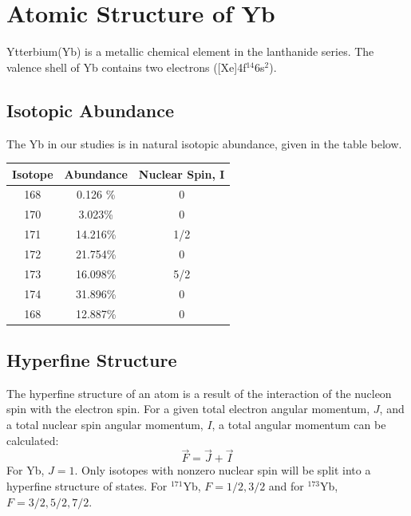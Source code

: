 \documentclass[12pt, a4paper]{article}
\begin{document}
\section{Atomic Structure of Yb}
Ytterbium(Yb) is a metallic chemical element in the lanthanide series. The valence shell of Yb contains two electrons ([Xe]4f$^{14}$6s$^{2}$).
\subsection{Isotopic Abundance}
The Yb in our studies is in natural isotopic abundance, given in the table below.
\begin{center}
\begin{tabular}{||c|c|c||}
\hline
Isotope & Abundance & Nuclear Spin, I\\
\hline \hline
168 & 0.126 \% & 0\\
\hline
170 & 3.023\% & 0 \\
\hline
171 & 14.216\% & 1/2 \\
\hline
172 & 21.754\% & 0 \\
\hline
173 & 16.098\% & 5/2 \\
\hline
174 & 31.896\% & 0 \\
\hline
168 & 12.887\% & 0 \\
\hline
\end{tabular}
\end{center}
\subsection{Hyperfine Structure}
The hyperfine structure of an atom is a result of the interaction of the nucleon spin with the electron spin. For a given total electron angular momentum, $J$, and a total nuclear spin angular momentum, $I$, a total angular momentum can be calculated:
\begin{equation}
\vec{F} = \vec{J} +\vec{I}
\end{equation}
For Yb, $J=1$. Only isotopes with nonzero nuclear spin will be split into a hyperfine structure of states. For $^{171}$Yb, $F=1/2,3/2$ and for $^{173}$Yb, $F=3/2,5/2,7/2$.
\end{document}

